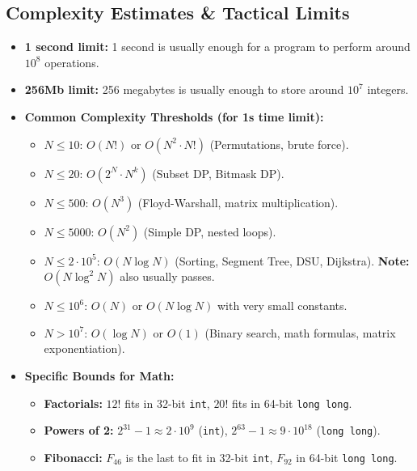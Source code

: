 \subsection{Complexity Estimates \& Tactical Limits}

\begin{itemize}
    \item \textbf{1 second limit:} 1 second is usually enough for a program to perform around $10^8$ operations.
    \item \textbf{256Mb limit:} 256 megabytes is usually enough to store around $10^7$ integers.
\end{itemize}

\begin{itemize} 
    \item \textbf{Common Complexity Thresholds (for 1s time limit):}
    \begin{itemize}
        \item $N \le 10$: $O(N!)$ or $O(N^2 \cdot N!)$ (Permutations, brute force).
        \item $N \le 20$: $O(2^N \cdot N^k)$ (Subset DP, Bitmask DP).
        \item $N \le 500$: $O(N^3)$ (Floyd-Warshall, matrix multiplication).
        \item $N \le 5000$: $O(N^2)$ (Simple DP, nested loops).
        \item $N \le 2 \cdot 10^5$: $O(N \log N)$ (Sorting, Segment Tree, DSU, Dijkstra). \textbf{Note:} $O(N \log^2 N)$ also usually passes.
        \item $N \le 10^6$: $O(N)$ or $O(N \log N)$ with very small constants.
        \item $N > 10^7$: $O(\log N)$ or $O(1)$ (Binary search, math formulas, matrix exponentiation).
    \end{itemize}
    \item \textbf{Specific Bounds for Math:}
    \begin{itemize}
        \item \textbf{Factorials:} $12!$ fits in 32-bit \texttt{int}, $20!$ fits in 64-bit \texttt{long long}.
        \item \textbf{Powers of 2:} $2^{31}-1 \approx 2 \cdot 10^9$ (\texttt{int}), $2^{63}-1 \approx 9 \cdot 10^{18}$ (\texttt{long long}).
        \item \textbf{Fibonacci:} $F_{46}$ is the last to fit in 32-bit \texttt{int}, $F_{92}$ in 64-bit \texttt{long long}.
    \end{itemize}
\end{itemize}

